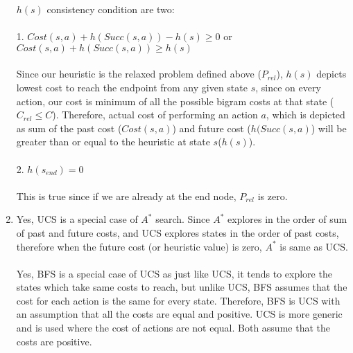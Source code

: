 \documentclass[12pt]{article}
\begin{document}
\begin{enumerate}[label=(\alph*)]
	$h(s)$ consistency condition are two: \\ \\
	1. $Cost(s,a) + h(Succ(s,a)) - h(s) \geq 0$ or $Cost(s,a) + h(Succ(s,a)) \geq h(s)$ \\ \\
	Since our heuristic is the relaxed problem defined above ($P_{rel}$), $h(s)$ depicts lowest cost to reach the endpoint from any given state $s$, since on every action, our cost is minimum of all the possible bigram costs at that state ($C_{rel} \leq C$). Therefore, actual cost of performing an action $a$, which is depicted as sum of the past cost ($Cost(s,a)$) and future cost ($h(Succ(s,a)$) will be greater than or equal to the heuristic at state $s$($h(s)$). \\ \\
	2. $h(s_{end}) = 0$ \\ \\
	This is true since if we are already at the end node, $P_{rel}$ is zero.
	
	\item Yes, UCS is a special case of $A^*$ search. Since $A^*$ explores in the order of sum of past and future costs, and UCS explores states in the order of past costs, therefore when the future cost (or heuristic value) is zero, $A^*$ is same as UCS. \\ \\
	 Yes, BFS is a special case of UCS as just like UCS, it tends to explore the states which take same costs to reach, but unlike UCS, BFS assumes that the cost for each action is the same for every state. Therefore, BFS is UCS with an assumption that all the costs are equal and positive. UCS is more generic and is used where the cost of actions are not equal. Both assume that the costs are positive.
	
	
\end{enumerate}
\end{document}
